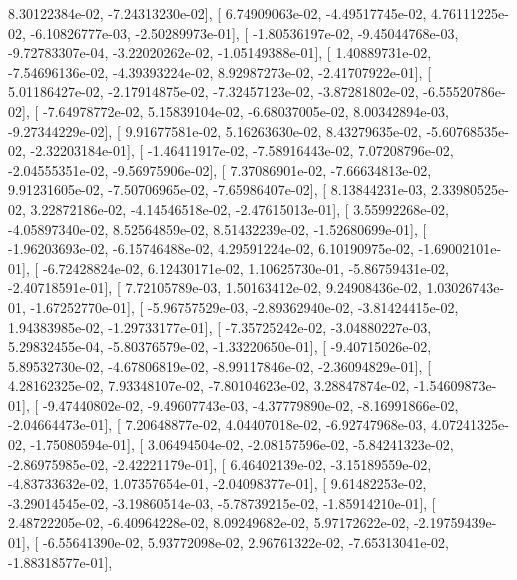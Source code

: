 \documentclass{article}
\begin{document}
          8.30122384e-02,  -7.24313230e-02],
       [  6.74909063e-02,  -4.49517745e-02,   4.76111225e-02,
         -6.10826777e-03,  -2.50289973e-01],
       [ -1.80536197e-02,  -9.45044768e-03,  -9.72783307e-04,
         -3.22020262e-02,  -1.05149388e-01],
       [  1.40889731e-02,  -7.54696136e-02,  -4.39393224e-02,
          8.92987273e-02,  -2.41707922e-01],
       [  5.01186427e-02,  -2.17914875e-02,  -7.32457123e-02,
         -3.87281802e-02,  -6.55520786e-02],
       [ -7.64978772e-02,   5.15839104e-02,  -6.68037005e-02,
          8.00342894e-03,  -9.27344229e-02],
       [  9.91677581e-02,   5.16263630e-02,   8.43279635e-02,
         -5.60768535e-02,  -2.32203184e-01],
       [ -1.46411917e-02,  -7.58916443e-02,   7.07208796e-02,
         -2.04555351e-02,  -9.56975906e-02],
       [  7.37086901e-02,  -7.66634813e-02,   9.91231605e-02,
         -7.50706965e-02,  -7.65986407e-02],
       [  8.13844231e-03,   2.33980525e-02,   3.22872186e-02,
         -4.14546518e-02,  -2.47615013e-01],
       [  3.55992268e-02,  -4.05897340e-02,   8.52564859e-02,
          8.51432239e-02,  -1.52680699e-01],
       [ -1.96203693e-02,  -6.15746488e-02,   4.29591224e-02,
          6.10190975e-02,  -1.69002101e-01],
       [ -6.72428824e-02,   6.12430171e-02,   1.10625730e-01,
         -5.86759431e-02,  -2.40718591e-01],
       [  7.72105789e-03,   1.50163412e-02,   9.24908436e-02,
          1.03026743e-01,  -1.67252770e-01],
       [ -5.96757529e-03,  -2.89362940e-02,  -3.81424415e-02,
          1.94383985e-02,  -1.29733177e-01],
       [ -7.35725242e-02,  -3.04880227e-03,   5.29832455e-04,
         -5.80376579e-02,  -1.33220650e-01],
       [ -9.40715026e-02,   5.89532730e-02,  -4.67806819e-02,
         -8.99117846e-02,  -2.36094829e-01],
       [  4.28162325e-02,   7.93348107e-02,  -7.80104623e-02,
          3.28847874e-02,  -1.54609873e-01],
       [ -9.47440802e-02,  -9.49607743e-03,  -4.37779890e-02,
         -8.16991866e-02,  -2.04664473e-01],
       [  7.20648877e-02,   4.04407018e-02,  -6.92747968e-03,
          4.07241325e-02,  -1.75080594e-01],
       [  3.06494504e-02,  -2.08157596e-02,  -5.84241323e-02,
         -2.86975985e-02,  -2.42221179e-01],
       [  6.46402139e-02,  -3.15189559e-02,  -4.83733632e-02,
          1.07357654e-01,  -2.04098377e-01],
       [  9.61482253e-02,  -3.29014545e-02,  -3.19860514e-03,
         -5.78739215e-02,  -1.85914210e-01],
       [  2.48722205e-02,  -6.40964228e-02,   8.09249682e-02,
          5.97172622e-02,  -2.19759439e-01],
       [ -6.55641390e-02,   5.93772098e-02,   2.96761322e-02,
         -7.65313041e-02,  -1.88318577e-01],
\end{document}
